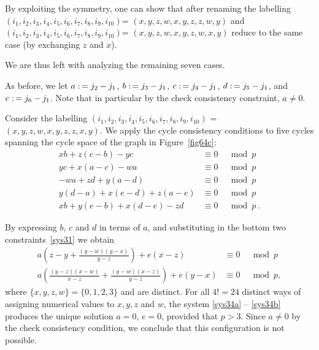 \noindent By exploiting the symmetry, one can show that after
renaming the labelling
\newline \noindent$(i_1,i_2,i_3,i_4,i_5,i_6,i_7,i_8,i_9,i_{10})$=
$(x,y,z,w,x,y,z,z,w,y)$ and
$(i_1,i_2,i_3,i_4,i_5,i_6,i_7,i_8,i_9,i_{10})$=
$(x,y,z,w,x,y,z,w,x,y)$ reduce to the same case (by exchanging $z$
and $x$). %

We are thus left with analyzing the remaining seven cases.

As before, we let $a \asn j_2-j_1$, $b \asn j_3-j_1$, $c \asn
j_4-j_1$,
 $d \asn j_5-j_1$, and $e \asn j_6-j_1$.  Note that in particular
 by the check consistency constraint, $a \neq 0$.

Consider the labelling
$(i_1,i_2,i_3,i_4,i_5,i_6,i_7,i_8,i_9,i_{10})$ =
$(x,y,z,w,x,y,z,z,x,y)$. We apply the cycle consistency conditions
to five cycles spanning the cycle space of the graph in
Figure~\ref{fig64c}:
 \begin{equation}\label{sys31}\begin{array}{cccc}
 xb+z(c-b)-yc &\equiv 0 &\mod p\\
 yc+x(a-c)-wa &\equiv 0 &\mod p\\
 -wa+zd+y(a-d) &\equiv 0 &\mod p\\
 y(d-a)+x(e-d)+z(a-e) &\equiv 0 &\mod p\\
 xb+y(e-b)+x(d-e)-zd &\equiv 0 &\mod p~.
 \end{array}\end{equation}



By expressing $b$, $c$ and $d$ in terms of $a$, and substituting
in the bottom two constraints~\eqref{sys31} we obtain
\begin{eqnarray}\label{sys34a}
a\left(z-y+\frac{(y-w)(y-x)}{y-z}\right)+e(x-z) &\equiv 0 &\mod
p\\
\label{sys34b}a\left(\frac{(y-z)(x-w)}{x-z}+\frac{(y-w)(x-z)}{y-z}\right)+e(y-x)&\equiv
0 &\mod p,
\end{eqnarray}
where $\{x,y,z,w\} =\{0,1,2,3\}$ and are distinct. For all $4!=24$
distinct ways of assigning numerical values to $x,y,z$ and $w$, the
system \eqref{sys34a} -- \eqref{sys34b} produces the unique solution
$a=0$, $e=0$, provided that $p>3$. Since $a\neq 0$ by the check
consistency condition, we conclude that this configuration is not
possible.

